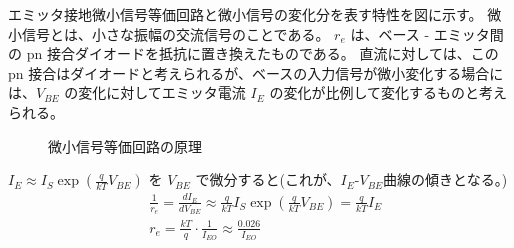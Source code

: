 エミッタ接地微小信号等価回路と微小信号の変化分を表す特性を図に示す。
微小信号とは、小さな振幅の交流信号のことである。
$r_e$ は、ベース - エミッタ間の pn 接合ダイオードを抵抗に置き換えたものである。
直流に対しては、この pn 接合はダイオードと考えられるが、ベースの入力信号が微小変化する場合には、$V_{BE}$ の変化に対してエミッタ電流 $I_E$ の変化が比例して変化するものと考えられる。
\begin{figure}[htb]
  \begin{center}
  \caption{微小信号等価回路の原理}
  \label{vbe_ie}
  \end{center}
\end{figure}

$I_E \approx I_S \exp(\frac{q}{kT}V_{BE})$ を $V_{BE}$ で微分すると(これが、$I_E$-$V_{BE}$曲線の傾きとなる。)\\
\begin{align}
  & \frac{1}{r_e} = \frac{dI_E}{dV_{BE}} \approx \frac{q}{kT}I_S\exp(\frac{q}{kT}V_{BE}) = \frac{q}{kT}I_E\\
  & r_e = \frac{kT}{q}\cdot\frac{1}{I_{EO}} \approx \frac{0.026}{I_{EO}}
\end{align}

